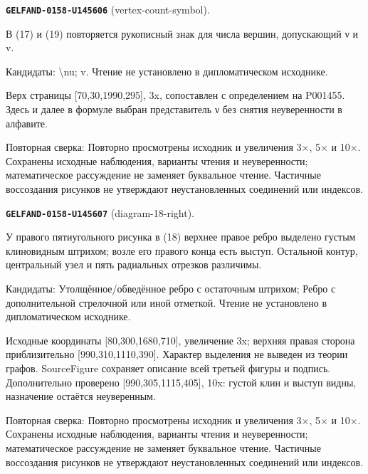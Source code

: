 \par\noindent\leavevmode{}\label{GELFAND-0158-U145606}\label{GELFAND-P001456:vertex-count-symbol}\textbf{\texttt{GELFAND-0158-U145606}} (vertex-count-symbol).\nopagebreak[4]\par
В (17) и (19) повторяется рукописный знак для числа вершин, допускающий ν и v.\par
Кандидаты: \textbackslash{}nu; v. Чтение не установлено в дипломатическом исходнике.\par
Верх страницы [70,30,1990,295], 3x, сопоставлен с определением на P001455. Здесь и далее в формуле выбран представитель ν без снятия неуверенности в алфавите.\par
Повторная сверка: Повторно просмотрены исходник и увеличения 3×, 5× и 10×. Сохранены исходные наблюдения, варианты чтения и неуверенности; математическое рассуждение не заменяет буквальное чтение. Частичные воссоздания рисунков не утверждают неустановленных соединений или индексов.\par\medskip
\par\noindent\leavevmode{}\label{GELFAND-0158-U145607}\label{GELFAND-P001456:diagram-18-right}\textbf{\texttt{GELFAND-0158-U145607}} (diagram-18-right).\nopagebreak[4]\par
У правого пятиугольного рисунка в (18) верхнее правое ребро выделено густым клиновидным штрихом; возле его правого конца есть выступ. Остальной контур, центральный узел и пять радиальных отрезков различимы.\par
Кандидаты: Утолщённое/обведённое ребро с остаточным штрихом; Ребро с дополнительной стрелочной или иной отметкой. Чтение не установлено в дипломатическом исходнике.\par
Исходные координаты [80,300,1680,710], увеличение 3x; верхняя правая сторона приблизительно [990,310,1110,390]. Характер выделения не выведен из теории графов. SourceFigure сохраняет описание всей третьей фигуры и подпись. Дополнительно проверено [990,305,1115,405], 10x: густой клин и выступ видны, назначение остаётся неуверенным.\par
Повторная сверка: Повторно просмотрены исходник и увеличения 3×, 5× и 10×. Сохранены исходные наблюдения, варианты чтения и неуверенности; математическое рассуждение не заменяет буквальное чтение. Частичные воссоздания рисунков не утверждают неустановленных соединений или индексов.\par\medskip
